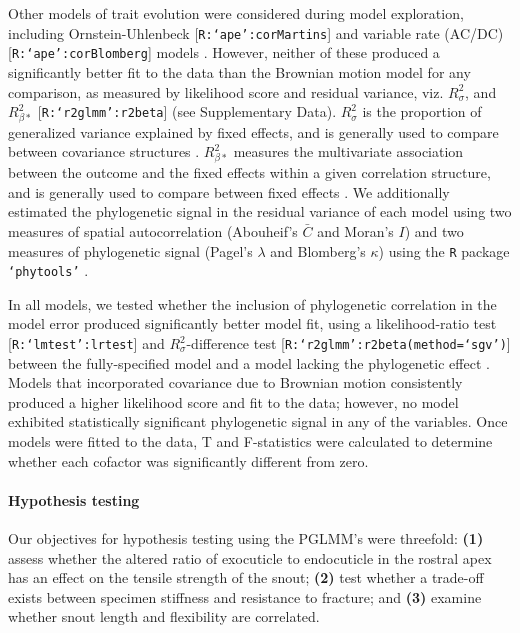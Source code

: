 \documentclass[twocolumn, linenumbers, superscriptaddress, nofootinbib]{revtex4-1}
\begin{document}
				Other models of trait evolution were considered during model exploration, including Ornstein-Uhlenbeck [\texttt{R:`ape':corMartins}] and variable rate (AC/DC) [\texttt{R:`ape':corBlomberg}] models \cite{Munkemuller2012, Ape}.
				However, neither of these produced a significantly better fit to the data than the Brownian motion model for any comparison, as measured by likelihood score and residual variance, viz. $R^2_{\sigma}$, and $R^2_{\beta*}$ [\texttt{R:`r2glmm':r2beta}] (see Supplementary Data).
				$R^{2}_{\sigma}$ is the proportion of generalized variance explained by fixed effects, and is generally used to compare between covariance structures \cite{Nakagawa2013, Jaeger2017, R2glmm}.
				$R^2_{\beta*}$ measures the multivariate association between the outcome and the fixed effects within a given correlation structure, and is generally used to compare between fixed effects  \cite{Nakagawa2013, Jaeger2017, R2glmm}.
				We additionally estimated the phylogenetic signal in the residual variance of each model using two measures of spatial autocorrelation (Abouheif's $\bar{C}$ and Moran's $I$) and two measures of phylogenetic signal (Pagel's $\lambda$ and Blomberg's $\kappa$) using the \texttt{R} package \texttt{`phytools'} \cite{Munkemuller2012, Phytools}.
				
				In all models, we tested whether the inclusion of phylogenetic correlation in the model error produced significantly better model fit, using a likelihood-ratio test [\texttt{R:`lmtest':lrtest}] and $R^{2}_{\sigma}$-difference test [\texttt{R:`r2glmm':r2beta(method=`sgv')}] between the fully-specified model and a model lacking the phylogenetic effect \cite{Lmtest, R2glmm}.
				Models that incorporated covariance due to Brownian motion consistently produced a higher likelihood score and fit to the data; however, no model exhibited statistically significant phylogenetic signal in any of the variables.
				Once models were fitted to the data, T and F-statistics were calculated to determine whether each cofactor was significantly different from zero.
				
			\paragraph*{Hypothesis testing}
				Our objectives for hypothesis testing using the PGLMM's were threefold: \textbf{(1)} assess whether the altered ratio of exocuticle to endocuticle in the rostral apex has an effect on the tensile strength of the snout; \textbf{(2)} test whether a trade-off exists between specimen stiffness and resistance to fracture; and \textbf{(3)} examine whether snout length and flexibility are correlated.
				
\end{document}
